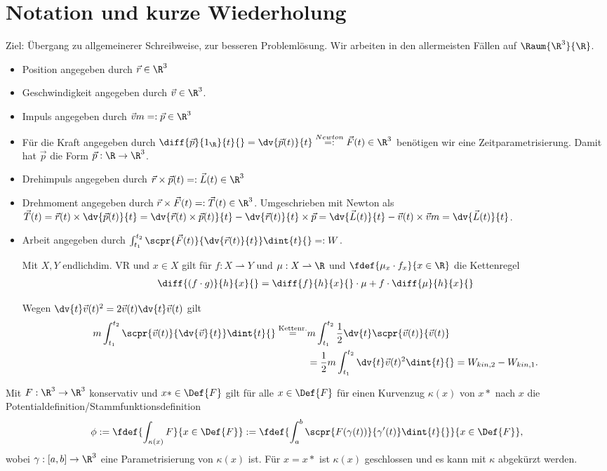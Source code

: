 \documentclass[../main.tex]{subfiles}
\begin{document}
	\section{Notation und kurze Wiederholung}
		Ziel: Übergang zu allgemeinerer Schreibweise, zur besseren Problemlösung. Wir arbeiten in den allermeisten Fällen auf $\Raum{\R^3}{\R}$. 
		\begin{itemize}
			\item Position angegeben durch $\vec{r}\in\R^3$
			\item Geschwindigkeit angegeben durch $\vec{v}\in\R^3$.
			\item Impuls angegeben durch $\vec v m=:\vec{p}\in\R^3$
			\item Für die Kraft angegeben durch $\diff{\vec p}{1_\R}{t}{}=\dv{\vec{p}(t)}{t}\stackrel{Newton}{=:}\vec{F}(t)\in\R^3$ benötigen wir eine Zeitparametrisierung. Damit hat $\vec p$ die Form $\vec p:\R\to\R^3$. 
			\item Drehimpuls angegeben durch $\vec r\times\vec p(t)=:\vec{L}(t)\in\R^3$
			\item Drehmoment angegeben durch $\vec{r}\times\vec F(t)=:\vec T(t)\in\R^3$. Umgeschrieben mit Newton als $\vec T(t)=\vec{r}(t)\times\dv{\vec p(t)}{t}=\dv{\vec r(t)\times\vec{p}(t)}{t}-\dv{\vec r(t)}{t}\times\vec p=\dv{\vec L(t)}{t}-\vec v(t)\times\vec vm=\dv{\vec L(t)}{t}$. 
			\item Arbeit angegeben durch $\int_{t_1}^{t_2}\scpr{\vec F(t)}{\dv{\vec r(t)}{t}}\dint{t}{}=:W$. 
			\begin{Erinnerung}
				Mit $X,Y$ endlichdim. VR und $x\in X$ gilt für $f:X\rightharpoonup Y$ und $\mu:X\rightharpoonup\R$ und $\fdef{\mu_x\cdot f_x}{x\in\R}$ die Kettenregel 
				\begin{align*}
					\diff{(f\cdot g)}{h}{x}{}=\diff{f}{h}{x}{}\cdot \mu+f\cdot\diff{\mu}{h}{x}{}
				\end{align*}
			\end{Erinnerung}
			Wegen $\dv{t}\vec{v}(t)^2=2\vec{v}(t)\dv{t}\vec{v}(t)$ gilt 
			\begin{align*}
				m\int_{t_1}^{t_2}\scpr{\vec v(t)}{\dv{\vec v}{t}}\dint{t}{}\stackrel{\text{Kettenr.}}{=}& m\int_{t_1}^{t_2}\frac{1}{2}\dv{t}\scpr{\vec{v}(t)}{\vec{v}(t)}\\
				&=\frac{1}{2}m\int_{t_1}^{t_2}\dv{t}\vec{v}(t)^2\dint{t}{}=W_{kin,2}-W_{kin,1}. 
			\end{align*}
		\end{itemize}
		\begin{Erinnerung}
			Mit $F:\R^3\to\R^3$ konservativ und $x*\in\Def{F}$ gilt für alle $x\in\Def{F}$ für einen Kurvenzug $\kappa(x)$ von $x*$ nach $x$ die Potentialdefinition/Stammfunktionsdefinition
			\begin{align*}
				\phi:=\fdef{\int_{\kappa(x)}F}{x\in\Def{F}}:=\fdef{\int_a^b\scpr{F(\gamma(t))}{\gamma'(t)}\dint{t}{}}{x\in\Def{F}},
			\end{align*}
			wobei $\gamma:[a,b]\to\R^3$ eine Parametrisierung von $\kappa(x)$ ist. Für $x=x*$ ist $\kappa(x)$ geschlossen und es kann mit $\kappa$ abgekürzt werden. 
		\end{Erinnerung}
\end{document}
